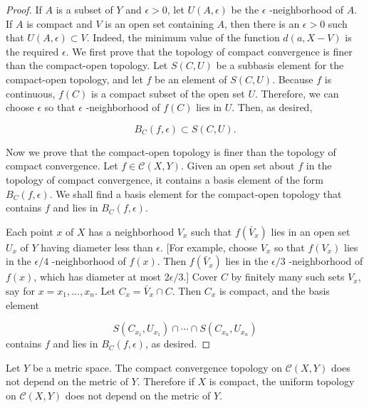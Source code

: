 \begin{proof}
If \(A\) is a subset of \(Y\) and \(\epsilon > 0\), let \(U({A,\epsilon })\) be the \(\epsilon\) -neighborhood of \(A\). If \(A\) is compact and \(V\) is an open set containing \(A\), then there is an \(\epsilon > 0\) such that \(U({A,\epsilon }) \subset V\). Indeed, the minimum value of the function \(d({a,X - V})\) is the required \(\epsilon\).
We first prove that the topology of compact convergence is finer than the compact-open topology. Let \(S({C,U})\) be a subbasis element for the compact-open topology, and let \(f\) be an element of \(S({C,U})\). Because \(f\) is continuous, \(f( C)\) is a compact subset of the open set \(U\). Therefore, we can choose \(\epsilon\) so that \(\epsilon\) -neighborhood of \(f( C)\) lies in \(U\). Then, as desired,

\[
B_{C}({f,\epsilon }) \subset S({C,U}) \text{.}
\]

Now we prove that the compact-open topology is finer than the topology of compact convergence. Let \(f \in \mathcal{C}({X,Y})\). Given an open set about \(f\) in the topology of compact convergence, it contains a basis element of the form \(B_{C}({f,\epsilon })\). We shall find a basis element for the compact-open topology that contains \(f\) and lies in \(B_{C}({f,\epsilon })\).

Each point \(x\) of \(X\) has a neighborhood \(V_{x}\) such that \(f(\bar{V}_{x})\) lies in an open set \(U_{x}\) of \(Y\) having diameter less than \(\epsilon\). [For example, choose \(V_{x}\) so that \(f(V_{x})\) lies in the \(\epsilon /4\) -neighborhood of \(f(x)\). Then \(f(\bar{V}_{x})\) lies in the \(\epsilon /3\) -neighborhood of \(f(x)\), which has diameter at most \({2\epsilon }/3\).] Cover \(C\) by finitely many such sets \(V_{x}\), say for \(x = x_{1},\ldots ,x_{n}\). Let \(C_{x} = \bar{V}_{x} \cap C\). Then \(C_{x}\) is compact, and the basis element

\[
S({C_{x_{1}},U_{x_{1}}}) \cap \cdots \cap S({C_{x_{n}},U_{x_{n}}})
\]
contains \(f\) and lies in \(B_{C}({f,\epsilon })\), as desired.
\end{proof}
\begin{corollary}
\label{cor:\thetheorem}
Let \(Y\) be a metric space. The compact convergence topology on \(\mathcal{C}({X,Y})\) does not depend on the metric of \(Y\). Therefore if \(X\) is compact, the uniform topology on \(\mathcal{C}({X,Y})\) does not depend on the metric of \(Y\).
\end{corollary}

